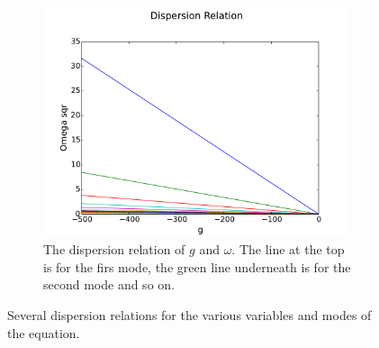\begin{figure}[h!]
        ~ %
        \begin{subfigure}[b]{.5\textwidth}
                 \includegraphics[width=9cm]{../src/plot/DispersionG}
\caption{The dispersion relation of $ g $ and $ \omega $. The line at the top is for the firs mode, the green line underneath is for the second mode and so on.}
                \label{fig:mouse}
        \end{subfigure}
        \caption{Several dispersion relations for the various variables and modes of the equation.}\label{fig:DispersionRelations}
\end{figure}